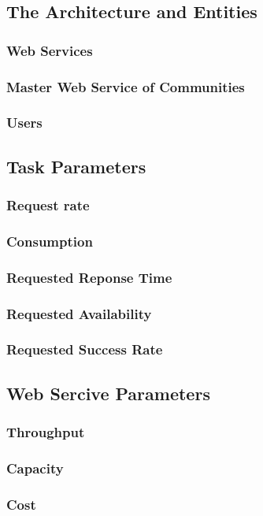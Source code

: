 \documentclass[10pt, conference, compsocconf]{IEEEtran}
\theoremstyle{plain}
\theoremstyle{definition}
\begin{document}
\subsection{The Architecture and Entities }
\subsubsection{Web Services}
\subsubsection{Master Web Service of Communities}
\subsubsection{Users}

\subsection{Task Parameters}
\subsubsection{Request rate}
\subsubsection{Consumption}
\subsubsection{Requested Reponse Time}
\subsubsection{Requested Availability}
\subsubsection{Requested Success Rate}

\subsection{Web Sercive Parameters}
\subsubsection{Throughput}
\subsubsection{Capacity}
\subsubsection{Cost}
\end{document}
